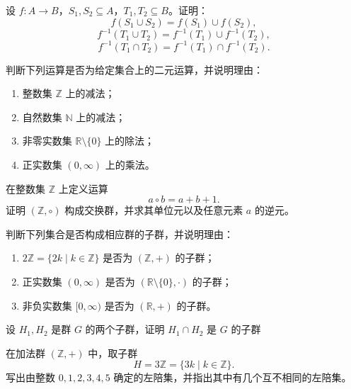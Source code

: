 \begin{exercise}
    \label{exer_abstract_5}
    设 \(f:A\rightarrow B\)，\(S_1,S_2\subseteq A\)，\(T_1,T_2\subseteq B\)。证明：
    \[
        f(S_1\cup S_2)=f(S_1)\cup f(S_2),
    \]
    \[
        f^{-1}(T_1\cup T_2)=f^{-1}(T_1)\cup f^{-1}(T_2),
    \]
    \[
        f^{-1}(T_1\cap T_2)=f^{-1}(T_1)\cap f^{-1}(T_2).
    \]
\end{exercise}

\begin{exercise}
    \label{exer_abstract_6}
    判断下列运算是否为给定集合上的二元运算，并说明理由：
    \begin{enumerate}
        \item 整数集 \(\mathbb Z\) 上的减法；
        \item 自然数集 \(\mathbb N\) 上的减法；
        \item 非零实数集 \(\mathbb R\setminus\{0\}\) 上的除法；
        \item 正实数集 \((0,\infty)\) 上的乘法。
    \end{enumerate}
\end{exercise}

\begin{exercise}
    \label{exer_abstract_7}
    在整数集 \(\mathbb Z\) 上定义运算
    \[
        a\circ b=a+b+1.
    \]
    证明 \((\mathbb Z,\circ)\) 构成交换群，并求其单位元以及任意元素 \(a\) 的逆元。
\end{exercise}

\begin{exercise}
    \label{exer_abstract_8}
    判断下列集合是否构成相应群的子群，并说明理由：
    \begin{enumerate}
        \item \(2\mathbb Z=\{2k\mid k\in\mathbb Z\}\) 是否为 \((\mathbb Z,+)\) 的子群；
        \item 正实数集 \((0,\infty)\) 是否为 \((\mathbb R\setminus\{0\},\cdot)\) 的子群；
        \item 非负实数集 \([0,\infty)\) 是否为 \((\mathbb R,+)\) 的子群。
    \end{enumerate}
\end{exercise}

\begin{exercise}
    \label{exer_abstract_9}
    设 \(H_1,H_2\) 是群 \(G\) 的两个子群，证明 \(H_1\cap H_2\) 是 \(G\) 的子群
\end{exercise}

\begin{exercise}
    \label{exer_abstract_10}
    在加法群 \((\mathbb Z,+)\) 中，取子群
    \[
        H=3\mathbb Z=\{3k\mid k\in\mathbb Z\}.
    \]
    写出由整数 \(0,1,2,3,4,5\) 确定的左陪集，并指出其中有几个互不相同的左陪集。
\end{exercise}

